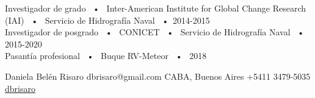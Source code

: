 \documentclass[pastel]{hipstercv}
\newlength{\rightcolwidth}
\begin{document}
\begin{paracol}{2}
\footnotesize
Investigador de grado ~•~ Inter-American Institute for Global Change Research (IAI) ~•~ Servicio de Hidrografía Naval ~•~2014-2015\\
Investigador de posgrado ~•~ CONICET ~•~ Servicio de Hidrografía Naval ~•~ 2015-2020\\
Pasantía profesional ~•~ Buque RV-Meteor ~•~ 2018

\vfill{} %

\setlength{\parindent}{0pt}
\begin{minipage}[t]{\rightcolwidth}
\begin{center}\fontfamily{\sfdefault}\selectfont \color{black!70}
{\small Daniela Bel\'en Risaro  dbrisaro@gmail.com  CABA, Buenos Aires \newline{}+5411 3479-5035  \protect\url{dbrisaro}
}
\end{center}
\end{minipage}


\end{paracol}
\end{document}
